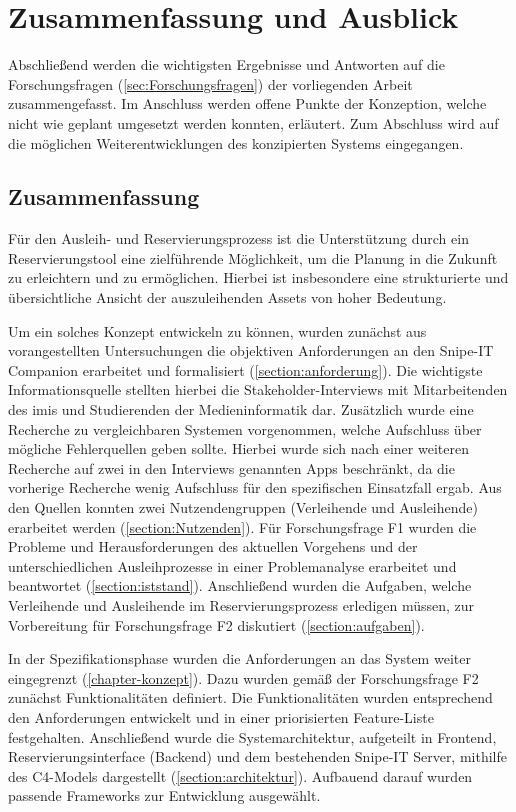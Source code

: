 
\chapter{Zusammenfassung und Ausblick}
\label{chapter-fazit}

Abschließend werden die wichtigsten Ergebnisse und Antworten auf die
Forschungsfragen (\ref{sec:Forschungsfragen}) der vorliegenden Arbeit
zusammengefasst. Im Anschluss werden offene Punkte der Konzeption, welche nicht
wie geplant umgesetzt werden konnten, erläutert. Zum Abschluss wird auf die
möglichen Weiterentwicklungen des konzipierten Systems eingegangen.


\section{Zusammenfassung}
Für den Ausleih- und Reservierungsprozess ist die Unterstützung durch ein
Reservierungstool eine zielführende Möglichkeit, um die Planung in die Zukunft
zu erleichtern und zu ermöglichen. Hierbei ist insbesondere eine strukturierte und
übersichtliche Ansicht der auszuleihenden Assets von hoher Bedeutung.

Um ein solches Konzept entwickeln zu können, wurden zunächst aus vorangestellten
Untersuchungen die objektiven Anforderungen an den Snipe-IT Companion erarbeitet
und formalisiert (\ref{section:anforderung}). Die wichtigste Informationsquelle
stellten hierbei die Stakeholder-Interviews mit Mitarbeitenden des \ac{imis} und
Studierenden der Medieninformatik dar. Zusätzlich wurde eine Recherche zu
vergleichbaren Systemen vorgenommen, welche Aufschluss über mögliche
Fehlerquellen geben sollte. Hierbei wurde sich nach einer weiteren Recherche auf
zwei in den Interviews genannten Apps beschränkt, da die vorherige Recherche
wenig Aufschluss für den spezifischen Einsatzfall ergab. Aus den Quellen konnten
zwei Nutzendengruppen (Verleihende und Ausleihende) erarbeitet werden
(\ref{section:Nutzenden}). Für Forschungsfrage F1 wurden die Probleme und
Herausforderungen des aktuellen Vorgehens und der unterschiedlichen
Ausleihprozesse in einer Problemanalyse erarbeitet und beantwortet
(\ref{section:iststand}). Anschließend wurden die Aufgaben, welche Verleihende
und Ausleihende im Reservierungsprozess erledigen müssen, zur Vorbereitung für
Forschungsfrage F2 diskutiert (\ref{section:aufgaben}).

In der Spezifikationsphase wurden die Anforderungen an das System weiter
eingegrenzt (\ref{chapter-konzept}). Dazu wurden gemäß der Forschungsfrage F2 zunächst
Funktionalitäten definiert. Die Funktionalitäten wurden entsprechend
den Anforderungen entwickelt und in einer priorisierten Feature-Liste
festgehalten. Anschließend wurde die Systemarchitektur, aufgeteilt in Frontend,
Reservierungsinterface (Backend) und dem bestehenden Snipe-IT Server, mithilfe
des C4-Models dargestellt (\ref{section:architektur}). Aufbauend darauf wurden
passende Frameworks zur Entwicklung ausgewählt.


